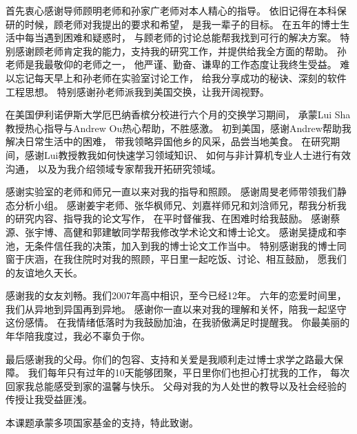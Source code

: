 \begin{acknowledgement}
  首先衷心感谢导师顾明老师和孙家广老师对本人精心的指导。
  依旧记得在本科保研的时候，顾老师对我提出的要求和希望，
  是我一辈子的目标。
  在五年的博士生活中每当遇到困难和疑惑时，
  与顾老师的讨论总能帮我找到可行的解决方案。
  特别感谢顾老师肯定我的能力，支持我的研究工作，并提供给我全方面的帮助。
  孙老师是我最敬仰的老师之一，
  他严谨、勤奋、谦卑的工作态度让我终生受益。
  难以忘记每天早上和孙老师在实验室讨论工作，
  给我分享成功的秘诀、深刻的软件工程思想。
  特别感谢孙老师派我到美国交换，让我开阔视野。

  
  在美国伊利诺伊斯大学厄巴纳香槟分校进行六个月的交换学习期间，
  承蒙Lui Sha教授热心指导与Andrew Ou热心帮助，不胜感激。
  初到美国，感谢Andrew帮助我解决日常生活中的困难，
  带我领略异国他乡的风采，品尝当地美食。
  在研究期间，感谢Lui教授教我如何快速学习领域知识、
  如何与非计算机专业人士进行有效沟通，
  以及为我介绍领域专家帮我开拓研究领域。
  

  感谢实验室的老师和师兄一直以来对我的指导和照顾。
  感谢周旻老师带领我们静态分析小组。
  感谢姜宇老师、张华枫师兄、刘嘉祥师兄和刘浛师兄，帮我分析我的研究内容、指导我的论文写作，
  在平时督催我、在困难时给我鼓励。
  感谢蔡源、张宇博、高健和郭建敏同学帮我修改学术论文和博士论文。
  感谢吴捷成和李池，无条件信任我的决策，加入到我的博士论文工作当中。
  特别感谢我的博士同窗于庆涵，在我住院时对我的照顾，平日里一起吃饭、讨论、相互鼓励，
  愿我们的友谊地久天长。
  
  
  感谢我的女友刘畅。我们2007年高中相识，至今已经12年。
  六年的恋爱时间里，我们从异地到异国再到异地。
  感谢你一直以来对我的理解和关怀，陪我一起坚守这份感情。
  在我情绪低落时为我鼓励加油，在我骄傲满足时提醒我。
  你最美丽的年华陪我度过，我必不辜负于你。
  
  最后感谢我的父母。你们的包容、支持和关爱是我顺利走过博士求学之路最大保障。
  我们每年只有过年的10天能够团聚，平日里你们也担心打扰我的工作，
  每次回家我总能感受到家的温馨与快乐。
  父母对我的为人处世的教导以及社会经验的传授让我受益匪浅。
  
  本课题承蒙多项国家基金的支持，特此致谢。
\end{acknowledgement}
